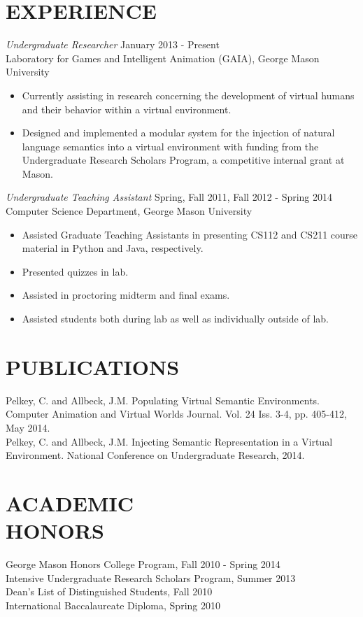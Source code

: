 \documentclass[margin]{res}
\begin{document}
\begin{resume}
\section{EXPERIENCE}
		{\sl Undergraduate Researcher} \hfill January 2013 - Present \\
		Laboratory for Games and Intelligent Animation (GAIA), George Mason University
		\begin{itemize}  \itemsep -2pt %
			\item Currently assisting in research concerning the development of virtual humans and their behavior within a virtual environment.
			\item Designed and implemented a modular system for the injection of natural language semantics into a virtual environment with funding from the Undergraduate Research Scholars Program, a competitive internal grant at Mason.
		\end{itemize}
		{\sl Undergraduate Teaching Assistant} \hfill Spring, Fall 2011, Fall 2012 - Spring 2014 \\
		Computer Science Department, George Mason University
		\begin{itemize}  \itemsep -2pt %
			\item Assisted Graduate Teaching Assistants in presenting CS112 and CS211 course material in Python and Java, respectively.
			\item Presented quizzes in lab.
			\item Assisted in proctoring midterm and final exams.
			\item Assisted students both during lab as well as individually outside of lab.
		\end{itemize}

\section{PUBLICATIONS}
	Pelkey, C. and Allbeck, J.M. Populating Virtual Semantic Environments. Computer Animation and Virtual Worlds Journal. Vol. 24 Iss. 3-4, pp. 405-412, May 2014.		\\
	Pelkey, C. and Allbeck, J.M. Injecting Semantic Representation in a Virtual Environment. National Conference on Undergraduate Research, 2014.

\section{ACADEMIC \\ HONORS}
	George Mason Honors College Program, Fall 2010 - Spring 2014	\\
	Intensive Undergraduate Research Scholars Program, Summer 2013	\\	
	Dean's List of Distinguished Students, Fall 2010	\\
	International Baccalaureate Diploma, Spring 2010			\\


\end{resume}
\end{document}
